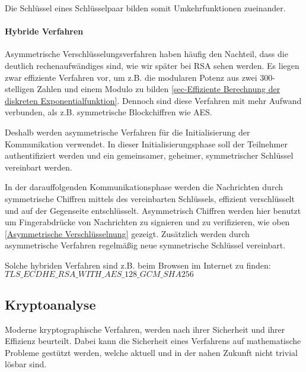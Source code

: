                 Die Schlüssel eines Schlüsselpaar bilden somit Umkehrfunktionen zueinander.

            \paragraph{Hybride Verfahren}
            \label{Hybride Verfahren}
                Asymmetrische Verschlüsselungsverfahren haben häufig den Nachteil, dass die deutlich rechenaufwändiges sind, wie wir später bei \ac{RSA} sehen werden. Es liegen zwar effiziente Verfahren vor, um z.B. die modularen Potenz aus zwei 300-stelligen Zahlen und einem Modulo zu bilden \ref{sec-Effiziente Berechnung der diskreten Exponentialfunktion}. Dennoch sind diese Verfahren mit mehr Aufwand verbunden, als z.B. symmetrische Blockchiffren wie \ac{AES}.
                
                Deshalb werden asymmetrische Verfahren für die Initialisierung der Kommunikation verwendet. In dieser Initialisierungsphase soll der Teilnehmer authentifiziert werden und ein gemeinsamer, geheimer, symmetrischer Schlüssel vereinbart werden. 
                
                In der darauffolgenden Kommunikationsphase werden die Nachrichten durch symmetrische Chiffren mittels des vereinbarten Schlüssels, effizient verschlüsselt und auf der Gegenseite entschlüsselt. Asymmetrisch Chiffren werden hier benutzt um Fingerabdrücke von Nachrichten zu signieren und zu verifizieren, wie oben \ref{Asymmetrische Verschlüsselnung} gezeigt. Zusätzlich werden durch asymmetrische Verfahren regelmäßig neue symmetrische Schlüssel vereinbart.

                Solche hybriden Verfahren sind z.B. beim Browsen im Internet zu finden: \textbf{$TLS\_ECDHE\_RSA\_WITH\_AES\_128\_GCM\_SHA256$}


    \subsection{Kryptoanalyse}
        \label{sec-Kryptoanalyse}
        Moderne kryptographische Verfahren, werden nach ihrer Sicherheit und ihrer Effizienz beurteilt. Dabei kann die Sicherheit eines Verfahrens auf mathematische Probleme gestützt werden, welche aktuell und in der nahen Zukunft nicht trivial lösbar sind. 

